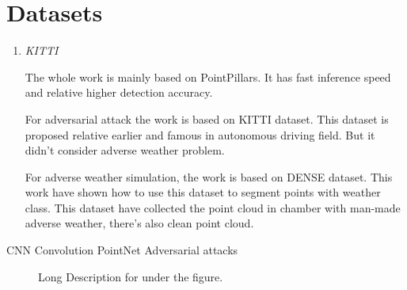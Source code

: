\section{Datasets}
\begin{enumerate}
\item\textit{KITTI}


The whole work is mainly based on PointPillars\cite{lang_pointpillars_2019}. It has fast inference speed and relative higher detection accuracy.

For adversarial attack the work is based on KITTI\cite{geiger_vision_2013} dataset. This dataset is proposed relative earlier and famous in autonomous driving field. But it didn't consider adverse weather problem.

For adverse weather simulation, the work is based on DENSE\cite{heinzler_cnn-based_2020} dataset. This work have shown how to use this dataset to segment points with weather class. This dataset have collected the point cloud in chamber with man-made adverse weather, there's also clean point cloud. 

\end{enumerate}
CNN
Convolution
PointNet
Adversarial attacks
\begin{figure}[!htbp]
    \centering
    \hspace{10pt}
    \caption[Short Description for List of Figures]{Long Description for under the figure.}
    \label{fig:logo1and2}
\end{figure}

